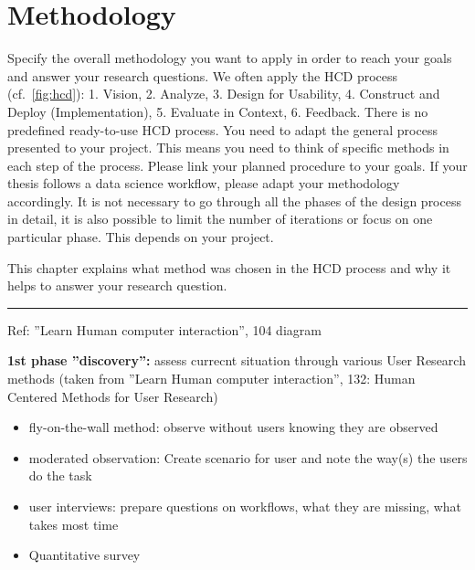 \section{Methodology}
\label{subsec:methodology}
Specify the overall methodology you want to apply in order to reach your goals and answer your research questions. We often apply the HCD process (cf.~\autoref{fig:hcd}): 1. Vision, 2. Analyze, 3. Design for Usability, 4. Construct and Deploy (Implementation), 5. Evaluate in Context, 6. Feedback. There is no predefined ready-to-use HCD process. You need to adapt the general process presented to your project. This means you need to think of specific methods in each step of the process. Please link your planned procedure to your goals. If your thesis follows a data science workflow, please adapt your methodology accordingly. It is not necessary to go through all the phases of the design process in detail, it is also possible to limit the number of iterations or focus on one particular phase. This depends on your project.

This chapter explains what method was chosen in the HCD process and why it helps to answer your research question.
\\
\hrule

Ref: ''Learn Human computer interaction'', 104 diagram

\textbf{1st phase ''discovery'':} assess currecnt situation through various User Research methods (taken from ''Learn Human computer interaction'', 132: Human Centered Methods for User Research)

\begin{itemize}
  \item fly-on-the-wall method: observe without users knowing they are observed
  \item moderated observation: Create scenario for user and note the way(s) the users do the task
  \item user interviews: prepare questions on workflows, what they are missing, what takes most time
  \item Quantitative survey
\end{itemize}


